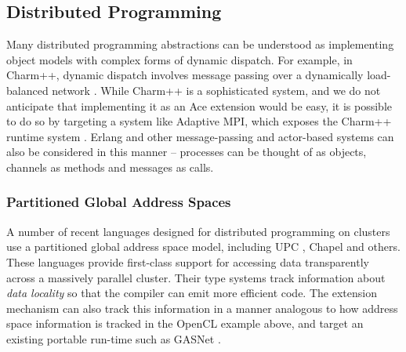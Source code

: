 \documentclass[9pt,preprint]{sigplanconf}
\begin{document}
\subsection{Distributed Programming}
Many distributed programming abstractions can be understood as implementing object models with complex forms of dynamic dispatch. For example, in Charm++, dynamic dispatch involves message passing over a dynamically load-balanced network \cite{kale1993charm++}. While Charm++ is a sophisticated system, and we do not anticipate that implementing it as an Ace extension would be easy, it is possible to do so by targeting a system like Adaptive MPI, which exposes the Charm++ runtime system \cite{kale2009charm++}. Erlang and other message-passing and actor-based systems can also be considered in this manner -- processes can be thought of as objects, channels as methods and messages as calls.

%
\subsubsection{Partitioned Global Address Spaces}

A number of recent languages designed for distributed programming on clusters use a partitioned global address space model, including UPC \cite{upc}, Chapel \cite{chapel} and others. These languages provide first-class support for accessing data transparently across a massively parallel cluster. Their type systems track information about \emph{data locality} so that the compiler can emit more efficient code. The extension mechanism can also track this information in a manner analogous to how address space information is tracked in the OpenCL example above, and target an existing portable run-time such as GASNet \cite{bonachea2002gasnet}.
\end{document}
